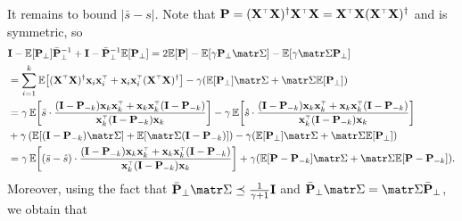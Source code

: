 \documentclass[../../thesis.tex]{subfiles}
\begin{document}
It remains to bound $|\bar s - s|$. Note that $\P=(\X^\top\X)^\dagger\X^\top\X = \X^\top\X
  (\X^\top\X)^\dagger$ and is symmetric, so
\begin{align*}
   & \I - \E[\P_\perp]\bar\P_\perp^{-1} + \I - \bar\P_\perp^{-1} \E[\P_\perp]
  = 2\E[\P] - \E[\gamma\P_\perp\Sigmab] - \E[\gamma\Sigmab\P_\perp]                                                                                        \\
   & = \sum_{i=1}^k\E\big[(\X^\top\X)^\dagger\x_i\x_i^\top + \x_i\x_i^\top (\X^\top\X)^\dagger \big] - \gamma (\E[\P_\perp]\Sigmab + \Sigmab \E[\P_\perp]) \\
   & =\gamma\,
  \E\bigg[\bar s\cdot\frac{(\I-\P_{-k})\x_k\x_k^\top + \x_k\x_k^\top (\I-\P_{-k})} {\x_k^\top(\I - \P_{-k}) \x_k}\bigg]
  -\gamma\,\E\bigg[\hat s
  \cdot\frac{(\I-\P_{-k})\x_k\x_k^\top + \x_k\x_k^\top (\I-\P_{-k})}{\x_k^\top(\I-\P_{-k})\x_k}\bigg]                                                      \\
   & +\gamma\,(\E[(\I - \P_{-k})\Sigmab] + \E[\Sigmab ( \I -\P_{-k}) ])- \gamma (\E[\P_\perp]\Sigmab + \Sigmab \E[\P_\perp])                               \\
   & =\gamma\,\E\bigg[(\bar s - \hat s)
    \cdot\frac{(\I-\P_{-k})\x_k\x_k^\top + \x_k\x_k^\top (\I-\P_{-k})}{\x_k^\top(\I-\P_{-k})\x_k}\bigg]
  +    \gamma (\E[\P-\P_{-k}]\Sigmab + \Sigmab \E[\P-\P_{-k}]).
\end{align*}
Moreover, using the fact that $\bar\P_\perp\Sigmab\preceq\frac1{\gamma+1}\I$ and $\bar \P_\perp \Sigmab = \Sigmab \bar \P_\perp$, we obtain that
\end{document}
